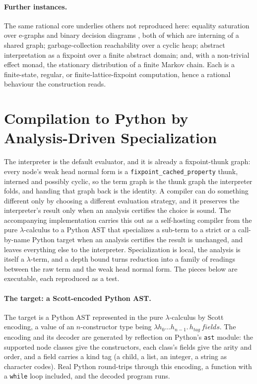 \paragraph{Further instances.}
The same rational core underlies others not reproduced here: equality saturation over e-graphs
 and binary decision diagrams , both of which are interning
of a shared graph; garbage-collection reachability over a cyclic heap; abstract interpretation as a
fixpoint over a finite abstract domain; and, with a non-trivial effect monad, the stationary
distribution of a finite Markov chain. Each is a finite-state, regular, or finite-lattice-fixpoint
computation, hence a rational behaviour the construction reads.

\section{Compilation to Python by Analysis-Driven Specialization}\label{app:compiler}
The interpreter is the default evaluator, and it is already a fixpoint-thunk graph: every node's
weak head normal form is a \texttt{fixpoint\_cached\_property} thunk, interned and possibly cyclic,
so the term graph is the thunk graph the interpreter folds, and handing that graph back is the
identity. A compiler can do something different only by choosing a different evaluation strategy, and
it preserves the interpreter's result only when an analysis certifies the choice is sound. The
accompanying implementation carries this
out as a self-hosting compiler from the pure $\lambda$-calculus to a Python AST that specializes a
sub-term to a strict or a call-by-name Python target when an analysis certifies the result is
unchanged, and leaves everything else to the interpreter. Specialization is local, the analysis is
itself a $\lambda$-term, and a depth bound turns reduction into a family of readings between the raw
term and the weak head normal form. The pieces below are executable, each reproduced as a test.

\paragraph{The target: a Scott-encoded Python AST.}
The target is a Python AST represented in the pure $\lambda$-calculus by Scott encoding, a value of
an $n$-constructor type being $\lambda h_0 \dots h_{n-1}.\,h_{\mathit{tag}}\,\mathit{fields}$. The
encoding and its decoder are generated by reflection on Python's \texttt{ast} module: the supported
node classes give the constructors, each class's fields give the arity and order, and a field
carries a kind tag (a child, a list, an integer, a string as character codes). Real Python
round-trips through this encoding, a function with a \texttt{while} loop included, and the decoded
program runs.

